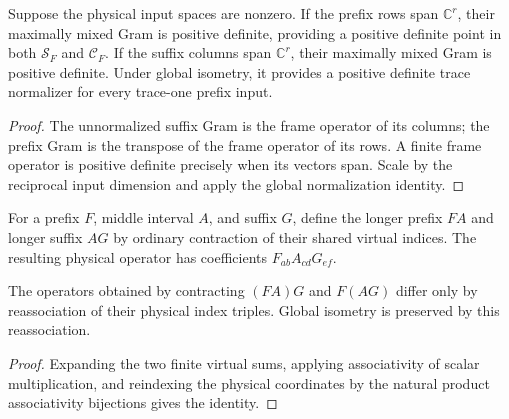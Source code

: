 \begin{lemma}
    \label{thm:mpu_minimal_cap_gram_witnesses}
    \leanok
    Suppose the physical input spaces are nonzero. If the prefix rows
    span $\mathbb C^r$, their maximally mixed Gram is positive definite,
    providing a positive definite point in both $\mathcal S_F$ and
    $\mathcal C_F$. If the suffix columns span $\mathbb C^r$, their
    maximally mixed Gram is positive definite. Under global isometry,
    it provides a positive definite trace normalizer for every
    trace-one prefix input.
\end{lemma}
\begin{proof}\leanok
    The unnormalized suffix Gram is the frame operator of its
    columns; the prefix Gram is the transpose of the frame operator
    of its rows. A finite frame operator is positive definite
    precisely when its vectors span. Scale by the reciprocal input
    dimension and apply the global normalization identity.
\end{proof}

\begin{definition}
    \label{def:mpu_three_part_factorization}
    \leanok
    For a prefix $F$, middle interval $A$, and suffix $G$, define
    the longer prefix $FA$ and longer suffix $AG$ by ordinary
    contraction of their shared virtual indices. The resulting
    physical operator has coefficients $F_{ab}A_{cd}G_{ef}$.
\end{definition}

\begin{lemma}
    \label{thm:mpu_factorization_reassociation}
    \leanok
    The operators obtained by contracting $(FA)G$ and $F(AG)$
    differ only by reassociation of their physical index triples.
    Global isometry is preserved by this reassociation.
\end{lemma}
\begin{proof}\leanok
    Expanding the two finite virtual sums, applying associativity of
    scalar multiplication, and reindexing the physical coordinates by
    the natural product associativity bijections gives the identity.
\end{proof}

